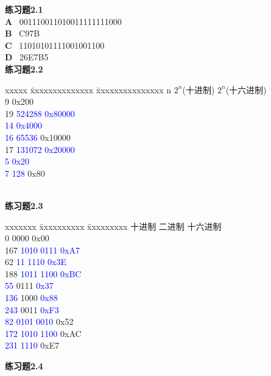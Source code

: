\documentclass{article}
\begin{document}
\begin{CJK}{UTF8}{uyhei}
\textbf{练习题2.1} \\[0.1cm]
\textbf{A} \ 001110011010011111111000 \\[0.1cm]
\textbf{B} \ C97B \\[0.1cm]
\textbf{C} \ 11010101111001001100 \\[0.1cm]
\textbf{D} \ 26E7B5 \\[0.7cm]
\textbf{练习题2.2}
\begin{tabbing}
xxxxx	\=	xxxxxxxxxxxxxx		\=	xxxxxxxxxxxxxxx	\kill
n	\>	$2^n$(十进制)  		\>	$2^n$(十六进制) 		\\
9				\>	0x200				\\
19	\>	\textcolor{blue}{524288}	\>	\textcolor{blue}{0x80000}	\\
\textcolor{blue}{14}				\>	\textcolor{blue}{0x4000}				\\
\textcolor{blue}{16}	\>	\textcolor{blue}{65536} 			\>	0x10000				\\
17	\>	\textcolor{blue}{131072}	\>	\textcolor{blue}{0x20000}	\\
\textcolor{blue}{5}		\>	\textcolor{blue}{0x20}		\\
\textcolor{blue}{7}	\>	\textcolor{blue}{128}			\>	0x80				
\end{tabbing} 
\ \\[0.2cm]
\textbf{练习题2.3}
\begin{tabbing}
	xxxxxxx	\=	xxxxxxxxxx	\=	xxxxxxxxx	\kill
	十进制	\>	二进制	\>	十六进制	\\
	0	 0000	\>	0x00	\\
	167	\>	\textcolor{blue}{1010 0111} 	\>	\textcolor{blue}{0xA7} 	\\
	62	\>	\textcolor{blue}{11 1110}  	\>	\textcolor{blue}{0x3E} 	\\
	188	\>	\textcolor{blue}{1011 1100} 	\>	\textcolor{blue}{0xBC}			\\
	\textcolor{blue}{55}	 0111	\>	\textcolor{blue}{0x37}	\\
	\textcolor{blue}{136}	 1000	\>	\textcolor{blue}{0x88}	\\
	\textcolor{blue}{243}	 0011	\>	\textcolor{blue}{0xF3}	\\
	\textcolor{blue}{82}	\>		\textcolor{blue}{0101 0010}	\>	0x52	\\
	\textcolor{blue}{172}	\>		\textcolor{blue}{1010 1100}	\>	0xAC	\\
	\textcolor{blue}{231}	\>		\textcolor{blue}{1110}	\>	0xE7	\\
\end{tabbing}
\textbf{练习题2.4} \\[0.2cm]

\end{CJK}
\end{document}
